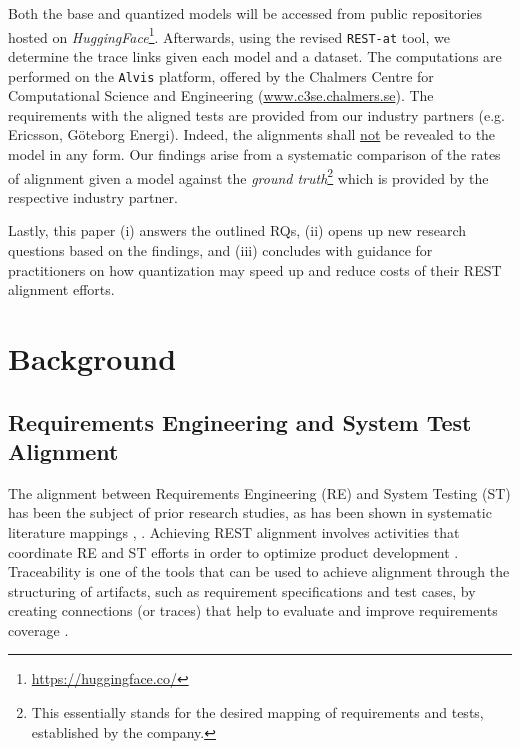 \documentclass[conference]{IEEEtran}
\begin{document}
Both the base and quantized models will be accessed from public repositories
hosted on \textit{HuggingFace}\footnote{\url{https://huggingface.co/}}.
Afterwards, using the revised \verb|REST-at|
tool, we determine the trace links
given each model and a dataset. The computations are performed on the
\verb|Alvis| platform, offered by the Chalmers Centre for Computational Science
and Engineering (\url{www.c3se.chalmers.se}). The requirements with the aligned
tests are provided from our industry partners (e.g. Ericsson, G\"oteborg
Energi). Indeed, the alignments shall \underline{not} be revealed to the model
in any form. Our findings arise from a systematic comparison of the rates of
alignment given a model against the \textit{ground truth}\footnote{This
essentially stands for the desired mapping of requirements and tests,
established by the company.} which is provided by the respective industry
partner.

Lastly, this paper (i) answers the outlined RQs, (ii) opens up new research
questions based on the findings, and (iii) concludes with guidance for
practitioners on how quantization may speed up and reduce costs of their REST
alignment efforts.

\section{Background}\label{background}


\subsection{Requirements Engineering and System Test Alignment}

The alignment between Requirements Engineering (RE) and System Testing (ST) has
been the subject of prior research studies, as has been shown in systematic
literature mappings \cite{barmi2011Alignment}, \cite{karhaapa2017What}.
Achieving REST alignment involves activities that coordinate RE and ST efforts
in order to optimize product development \cite{unterkalmsteiner2014Taxonomy}.
Traceability is one of the tools that can be used to achieve alignment through
the structuring of artifacts, such as requirement specifications and test cases,
by creating connections (or traces) that help to evaluate and improve
requirements coverage \cite{bjarnason2014Challenges}.
\end{document}
